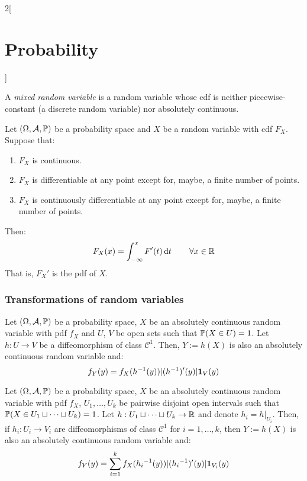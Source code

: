 \documentclass[../../../main_math.tex]{subfiles}
\begin{document}
\begin{multicols}{2}[\section{Probability}]
\begin{definition}
  \end{definition}
  \begin{definition}
    A \emph{mixed random variable} is a random variable whose cdf is neither piecewise-constant (a discrete random variable) nor absolutely  continuous.
  \end{definition}
  \begin{theorem}\label{P:Fprime}
    Let $(\Omega,\mathcal{A},\mathbb{P})$ be a probability space and $X$ be a random variable with cdf $F_X$. Suppose that:
    \begin{enumerate}
      \item $F_X$ is continuous.
      \item $F_X$ is differentiable at any point except for, maybe, a finite number of points.
      \item $F_X$ is continuously differentiable at any point except for, maybe, a finite number of points.
    \end{enumerate}
    Then: $$F_X(x)=\int_{-\infty}^xF'(t)\dd{t}\qquad\forall x\in\mathbb{R}$$
    That is, ${F_X}'$ is the pdf of $X$.
  \end{theorem}
  \subsubsection{Transformations of random variables}
  \begin{proposition}
    Let $(\Omega,\mathcal{A},\mathbb{P})$ be a probability space, $X$ be an absolutely continuous random variable with pdf $f_X$ and $U$, $V$ be open sets such that $\mathbb{P}(X\in U)=1$. Let $h:U\rightarrow V$ be a diffeomorphism of class $\mathcal{C}^1$. Then, $Y:=h(X)$ is also an absolutely continuous random variable and: $$f_Y(y)=f_X(h^{-1}(y))|(h^{-1})'(y)|\boldsymbol{\mathrm{1}}_{V}(y)$$
  \end{proposition}
  \begin{proposition}
    Let $(\Omega,\mathcal{A},\mathbb{P})$ be a probability space, $X$ be an absolutely continuous random variable with pdf $f_X$, $U_1,\ldots, U_k$ be pairwise disjoint open intervals such that $\mathbb{P}(X\in U_1\sqcup \cdots\sqcup U_k)=1$. Let $h:U_1\sqcup \cdots\sqcup U_k\rightarrow \mathbb{R}$ and denote $h_i=h|_{U_i}$. Then, if $h_i:U_i\rightarrow V_i$ are  diffeomorphisms of class $\mathcal{C}^1$ for $i=1,\ldots,k$, then $Y:=h(X)$ is also an absolutely continuous random variable and: $$f_Y(y)=\sum_{i=1}^kf_X({h_i}^{-1}(y))|({h_i}^{-1})'(y)|\boldsymbol{\mathrm{1}}_{V_i}(y)$$
  \end{proposition}

\end{multicols}
\end{document}
